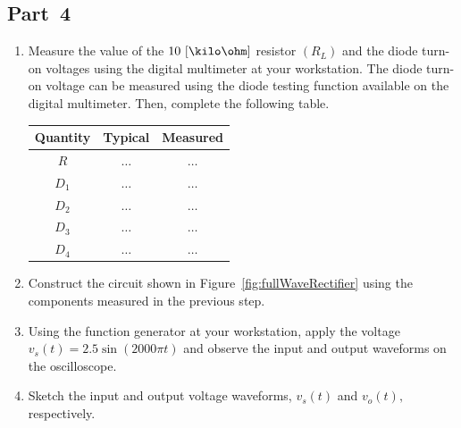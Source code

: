 \subsection{Part~4}
\label{sec:part4}
\begin{enumerate}
 
\item Measure the value of the $10~[\kilo\ohm]$ resistor $(R_L)$ and the diode turn-on voltages using the digital multimeter at your workstation. The diode turn-on voltage can be measured using the diode testing function available on the digital multimeter. Then, complete the following table.
%
  \begin{center}
    \begin{tabular}{c|c|c}
      \toprule
      Quantity &  Typical & Measured\\
      \toprule
      $R$ & $\ldots$ & $\ldots$\\   %
      $D_1$ & $\ldots$ & $\ldots$\\   %
      $D_2$ & $\ldots$ & $\ldots$\\   %
      $D_3$ & $\ldots$ & $\ldots$\\   %
      $D_4$ & $\ldots$ & $\ldots$\\   %
      \bottomrule
    \end{tabular}    
  \end{center}
  
\item Construct the circuit shown in Figure~\ref{fig:fullWaveRectifier} using the components measured in the previous step. 

\item  Using the function generator at your workstation, apply the voltage $v_s(t) = 2.5\sin(2000\pi t)$ and observe the input and output  waveforms on the oscilloscope.

\item Sketch the input and output voltage waveforms, $v_s(t)$ and $v_o(t),$ respectively.
  \begin{center}
  \end{center}
  

\end{enumerate}
